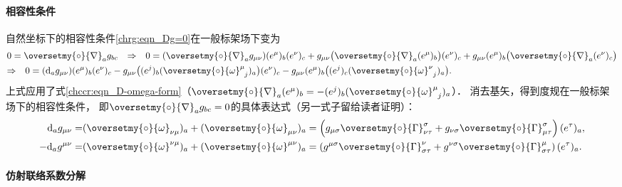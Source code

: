 \paragraph{相容性条件}
自然坐标下的相容性条件\eqref{chrg:eqn_Dg=0}在一般标架场下变为
\begin{align*}
	&0=\oversetmy{\circ}{\nabla}_a g_{bc} \quad {\Rightarrow}\quad 0=
	(\oversetmy{\circ}{\nabla}_a g_{\mu\nu}) (e^\mu)_b (e^\nu)_c
	+g_{\mu\nu} \bigl(\oversetmy{\circ}{\nabla}_a (e^\mu)_b\bigr) (e^\nu)_c
	+g_{\mu\nu}(e^\mu)_b \bigl(\oversetmy{\circ}{\nabla}_a (e^\nu)_c \bigr) \\
	&{\Rightarrow} \quad 0=
	({\rm d}_a g_{\mu\nu}) (e^\mu)_b (e^\nu)_c
	-g_{\mu\nu} \bigl( (e^j)_b (\oversetmy{\circ}{\omega}_{\hphantom{\sigma} j}^{\mu})_a \bigr) (e^\nu)_c
	-g_{\mu\nu}(e^\mu)_b \bigl((e^j)_c (\oversetmy{\circ}{\omega}_{\hphantom{\sigma} j}^{\nu})_a \bigr) .
\end{align*}  %
上式应用了式\eqref{chccr:eqn_D-omega-form}（$\oversetmy{\circ}{\nabla}_a (e^\mu)_b
=- (e^j)_b (\oversetmy{\circ}{\omega}_{\hphantom{\sigma} j}^{\mu})_a$）．
消去基矢，得到度规在一般标架场下的相容性条件，
即$\oversetmy{\circ}{\nabla}_a g_{bc}=0$的具体表达式（另一式子留给读者证明）：
\begin{subequations}\label{chrg:eqn_Dg=0-onframes}
	\begin{align}
	{\rm d}_a g_{\mu\nu} 
	=& (\oversetmy{\circ}{\omega}_{\nu \mu})_a + (\oversetmy{\circ}{\omega}_{\mu \nu})_a
	= \left(g_{\mu\sigma}\oversetmy{\circ}{\Gamma}^{\sigma}_{\nu\tau}
	+ g_{\nu\sigma}\oversetmy{\circ}{\Gamma}^{\sigma}_{\mu\tau}\right) (e^\tau)_a ,\\
	-{\rm d}_a g^{\mu\nu} 
	=& (\oversetmy{\circ}{\omega}^{\nu \mu})_a + (\oversetmy{\circ}{\omega}^{\mu \nu})_a
	= \left(g^{\mu\sigma}\oversetmy{\circ}{\Gamma}^{\nu}_{\sigma\tau}
	+ g^{\nu\sigma}\oversetmy{\circ}{\Gamma}^{\mu}_{\sigma\tau}\right) (e^\tau)_a .
	\end{align}
\end{subequations}


\paragraph{仿射联络系数分解}

